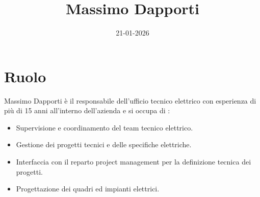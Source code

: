 \documentclass[12pt, a4paper]{article} %
\title{Massimo Dapporti}
\date{21-01-2026}
\begin{document}
\maketitle

\section{Ruolo} 
Massimo Dapporti è il responsabile dell'ufficio tecnico elettrico con
esperienza di più di 15 anni all'interno dell'azienda e si occupa di :
\begin{itemize}
      \item Supervisione e coordinamento del team tecnico elettrico.
      \item Gestione dei progetti tecnici e delle specifiche elettriche.
      \item Interfaccia con il reparto project management per la definizione tecnica dei
            progetti.
      \item Progettazione dei quadri ed impianti elettrici.
\end{itemize}
\end{document}
